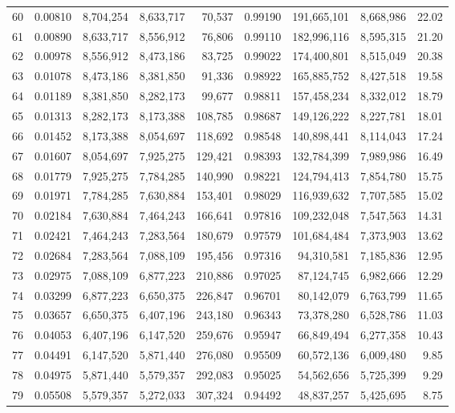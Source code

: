 \begin{longtable}{rrrrrrrrr}
60 & 0.00810 & 8,704,254 & 8,633,717 & 70,537 & 0.99190 & 191,665,101 & 8,668,986 & 22.02 \\
61 & 0.00890 & 8,633,717 & 8,556,912 & 76,806 & 0.99110 & 182,996,116 & 8,595,315 & 21.20 \\
62 & 0.00978 & 8,556,912 & 8,473,186 & 83,725 & 0.99022 & 174,400,801 & 8,515,049 & 20.38 \\
63 & 0.01078 & 8,473,186 & 8,381,850 & 91,336 & 0.98922 & 165,885,752 & 8,427,518 & 19.58 \\
64 & 0.01189 & 8,381,850 & 8,282,173 & 99,677 & 0.98811 & 157,458,234 & 8,332,012 & 18.79 \\
65 & 0.01313 & 8,282,173 & 8,173,388 & 108,785 & 0.98687 & 149,126,222 & 8,227,781 & 18.01 \\
66 & 0.01452 & 8,173,388 & 8,054,697 & 118,692 & 0.98548 & 140,898,441 & 8,114,043 & 17.24 \\
67 & 0.01607 & 8,054,697 & 7,925,275 & 129,421 & 0.98393 & 132,784,399 & 7,989,986 & 16.49 \\
68 & 0.01779 & 7,925,275 & 7,784,285 & 140,990 & 0.98221 & 124,794,413 & 7,854,780 & 15.75 \\
69 & 0.01971 & 7,784,285 & 7,630,884 & 153,401 & 0.98029 & 116,939,632 & 7,707,585 & 15.02 \\
70 & 0.02184 & 7,630,884 & 7,464,243 & 166,641 & 0.97816 & 109,232,048 & 7,547,563 & 14.31 \\
71 & 0.02421 & 7,464,243 & 7,283,564 & 180,679 & 0.97579 & 101,684,484 & 7,373,903 & 13.62 \\
72 & 0.02684 & 7,283,564 & 7,088,109 & 195,456 & 0.97316 & 94,310,581 & 7,185,836 & 12.95 \\
73 & 0.02975 & 7,088,109 & 6,877,223 & 210,886 & 0.97025 & 87,124,745 & 6,982,666 & 12.29 \\
74 & 0.03299 & 6,877,223 & 6,650,375 & 226,847 & 0.96701 & 80,142,079 & 6,763,799 & 11.65 \\
75 & 0.03657 & 6,650,375 & 6,407,196 & 243,180 & 0.96343 & 73,378,280 & 6,528,786 & 11.03 \\
76 & 0.04053 & 6,407,196 & 6,147,520 & 259,676 & 0.95947 & 66,849,494 & 6,277,358 & 10.43 \\
77 & 0.04491 & 6,147,520 & 5,871,440 & 276,080 & 0.95509 & 60,572,136 & 6,009,480 & 9.85 \\
78 & 0.04975 & 5,871,440 & 5,579,357 & 292,083 & 0.95025 & 54,562,656 & 5,725,399 & 9.29 \\
79 & 0.05508 & 5,579,357 & 5,272,033 & 307,324 & 0.94492 & 48,837,257 & 5,425,695 & 8.75 \\

\end{longtable}
